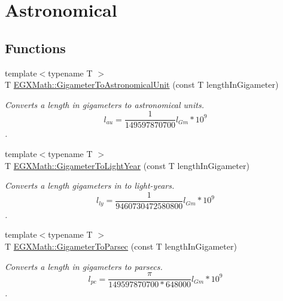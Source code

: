 \hypertarget{group___e_g_x_math-_conversions-_length_conversions-_gigameter-_astronomical}{}\section{Astronomical}
\label{group___e_g_x_math-_conversions-_length_conversions-_gigameter-_astronomical}
\subsection*{Functions}
\begin{DoxyCompactItemize}
\item 
{\footnotesize template$<$typename T $>$ }\\T \mbox{\hyperlink{group___e_g_x_math-_conversions-_length_conversions-_gigameter-_astronomical_ga048b5af6ec2f33e28435823ffa238d17}{E\+G\+X\+Math\+::\+Gigameter\+To\+Astronomical\+Unit}} (const T length\+In\+Gigameter)
\begin{DoxyCompactList}\small\item\em Converts a length in gigameters to astronomical units. \[ l_{au}= \frac{1}{149597870700} l_{Gm} * 10^{9} \]. \end{DoxyCompactList}\item 
{\footnotesize template$<$typename T $>$ }\\T \mbox{\hyperlink{group___e_g_x_math-_conversions-_length_conversions-_gigameter-_astronomical_ga352bdc453f4bccc2dd188f009c02ff62}{E\+G\+X\+Math\+::\+Gigameter\+To\+Light\+Year}} (const T length\+In\+Gigameter)
\begin{DoxyCompactList}\small\item\em Converts a length gigameters in to light-\/years. \[ l_{ly}= \frac{1}{9460730472580800} l_{Gm} * 10^{9} \]. \end{DoxyCompactList}\item 
{\footnotesize template$<$typename T $>$ }\\T \mbox{\hyperlink{group___e_g_x_math-_conversions-_length_conversions-_gigameter-_astronomical_ga5a83442adf1a2b81447b7355527f5ec4}{E\+G\+X\+Math\+::\+Gigameter\+To\+Parsec}} (const T length\+In\+Gigameter)
\begin{DoxyCompactList}\small\item\em Converts a length in gigameters to parsecs. \[ l_{pc}=\frac{\pi}{149597870700 * 648000} l_{Gm} * 10^{9} \]. \end{DoxyCompactList}\end{DoxyCompactItemize}


